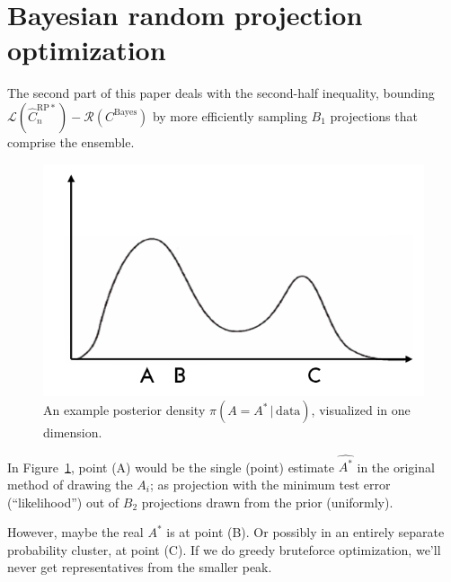 \documentclass[ejs,preprint]{imsart}
\newcommand\cbayes{C^{\mathrm{Bayes}}}
\newcommand\crpnhatstar{\hat{C}_{n}^{\mathrm{RP*}}}
\newcommand\risk{\mathcal{L}}
\newcommand\rrisk{\mathcal{R}}
\begin{document}
\section{Bayesian random projection optimization}

The second part of this paper deals with the second-half inequality, bounding $\risk(\crpnhatstar) - \rrisk(\cbayes)$ by more efficiently sampling $B_1$ projections that comprise the ensemble.

\begin{figure}
\begin{centering}
\includegraphics[scale=0.4]{illustration1}
\caption{An example posterior density $\pi(A=A^*\,|\,\mathrm{data})$, visualized in one dimension.
\label{fig:illust1}}
\par\end{centering}
\end{figure}

In Figure~\ref{fig:illust1}, point (A) would be the single (point) estimate $\widehat{A^*}$ in the original method of drawing the $A_i$; as projection with the minimum test error (``likelihood'') out of $B_2$ projections drawn from the prior (uniformly).

However, maybe the real $A^*$ is at point (B). Or possibly in an entirely separate probability cluster, at point (C). If we do greedy bruteforce optimization, we'll never get representatives from the smaller peak.
\end{document}
